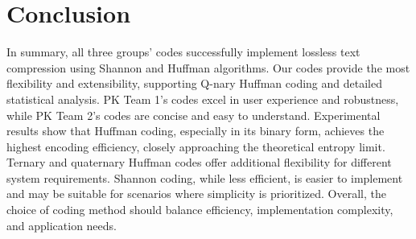 \documentclass[12pt]{article}
\begin{document}
\section{Conclusion}
In summary, all three groups' codes successfully implement lossless text compression using Shannon and Huffman algorithms. Our codes provide the most flexibility and extensibility, supporting Q-nary Huffman coding and detailed statistical analysis. PK Team 1's codes excel in user experience and robustness, while PK Team 2's codes are concise and easy to understand. Experimental results show that Huffman coding, especially in its binary form, achieves the highest encoding efficiency, closely approaching the theoretical entropy limit. Ternary and quaternary Huffman codes offer additional flexibility for different system requirements. Shannon coding, while less efficient, is easier to implement and may be suitable for scenarios where simplicity is prioritized. Overall, the choice of coding method should balance efficiency, implementation complexity, and application needs.
\end{document}
